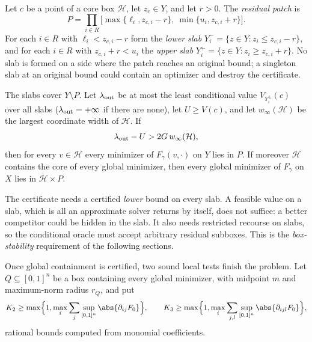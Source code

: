 Let $c$ be a point of a core box $\mathcal H$, let $z_c\in Y$, and let $r>0$.
The \emph{residual patch} is
\[
 P=\prod_{i\in R}\bigl[\max\{\ell_i,z_{c,i}-r\},\ \min\{u_i,z_{c,i}+r\}\bigr].
\]
For each $i\in R$ with $\ell_i<z_{c,i}-r$ form the \emph{lower slab}
$Y_i^-=\{z\in Y:z_i\le z_{c,i}-r\}$, and for each $i\in R$ with
$z_{c,i}+r<u_i$ the \emph{upper slab} $Y_i^+=\{z\in Y:z_i\ge z_{c,i}+r\}$.
No slab is formed on a side where the patch reaches an original bound; a
singleton slab at an original bound could contain an optimizer and destroy
the certificate.

\begin{lemma}\label{lem:rec:exclusion}
The slabs cover $Y\setminus P$. Let $\lambda_{\rm out}$ be at most the least
conditional value $V_{Y_i^\pm}(c)$ over all slabs ($\lambda_{\rm out}=+\infty$
if there are none), let $U\ge V(c)$, and let $w_\infty(\mathcal H)$ be the
largest coordinate width of $\mathcal H$. If
\begin{equation}\label{eq:rec:exclusion}
 \lambda_{\rm out}-U>2G\,w_\infty(\mathcal H),
\end{equation}
then for every $v\in\mathcal H$ every minimizer of $F_\gamma(v,\cdot)$ on $Y$
lies in $P$. If moreover $\mathcal H$ contains the core of every global
minimizer, then every global minimizer of $F_\gamma$ on $X$ lies in
$\mathcal H\times P$.
\end{lemma}

The certificate needs a certified \emph{lower} bound on every slab. A
feasible value on a slab, which is all an approximate solver returns by
itself, does not suffice: a better competitor could be hidden in the slab.
It also needs restricted recourse on slabs, so the conditional oracle must
accept arbitrary residual subboxes. This is the \emph{box-stability}
requirement of the following sections.

Once global containment is certified, two sound local tests finish the
problem. Let $Q\subseteq[0,1]^n$ be a box containing every global
minimizer, with midpoint $m$ and maximum-norm radius $r_Q$, and put
\begin{equation}\label{eq:rec:K}
 K_2\ge\max\Bigl\{1,\max_i\sum_j\sup_{[0,1]^n}\abs{\partial_{ij}F_0}\Bigr\},
 \qquad
 K_3\ge\max\Bigl\{1,\max_i\sum_{j,l}\sup_{[0,1]^n}\abs{\partial_{ijl}F_0}\Bigr\},
\end{equation}
rational bounds computed from monomial coefficients.

